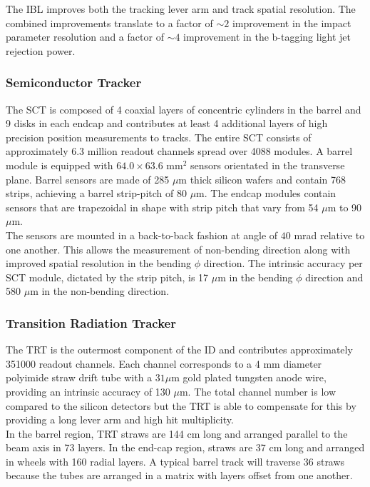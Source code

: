 \indent The IBL improves both the tracking lever arm and track spatial resolution.  The combined improvements translate to a factor of $\sim2$ improvement in the impact parameter resolution and a factor of $\sim4$ improvement in the b-tagging light jet rejection power. \\

\subsubsection*{ Semiconductor Tracker}

\indent The SCT is composed of 4 coaxial layers of concentric cylinders in the barrel and 9 disks in each endcap and contributes at least 4 additional layers of high precision position measurements to tracks.  The entire SCT consists of approximately 6.3 million readout channels spread over 4088 modules.  A barrel module is equipped with $64.0 \times 63.6$ mm$^2$ sensors orientated in the transverse plane.  Barrel sensors are made of 285 $\mu$m thick silicon wafers and contain 768 strips, achieving a barrel strip-pitch of 80 $\mu$m.  The endcap modules contain sensors that are trapezoidal in shape with strip pitch that vary from 54 $\mu$m to 90 $\mu$m.  \\

\indent The sensors are mounted in a back-to-back fashion at angle of $40$ mrad relative to one another.  This allows the measurement of non-bending direction along with improved spatial resolution in the bending $\phi$ direction. The intrinsic accuracy per SCT module, dictated by the strip pitch, is 17 $\mu$m in the bending $\phi$ direction and 580 $\mu$m in the non-bending direction.\\

\subsubsection*{Transition Radiation Tracker}

\indent The TRT is the outermost component of the ID and contributes approximately 351000 readout channels.  Each channel corresponds to a 4 mm diameter polyimide straw drift tube with a $31 \mu$m gold plated tungsten anode wire, providing an intrinsic accuracy of 130 $\mu$m.  The total channel number is low compared to the silicon detectors but the TRT is able to compensate for this by providing a long lever arm and high hit multiplicity.  \\

\indent In the barrel region, TRT straws are 144 cm long and arranged parallel to the beam axis in 73 layers. In the end-cap region, straws are 37 cm long and arranged in wheels with 160 radial layers.  A typical barrel track will traverse 36 straws because the tubes are arranged in a matrix with layers offset from one another.\\

